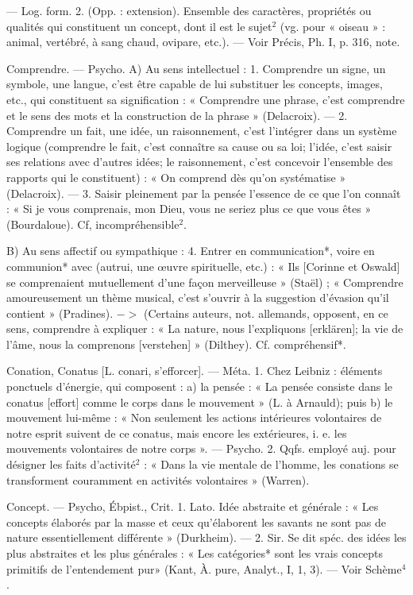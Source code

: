 — Log. form. 2. (Opp. : extension). Ensemble des caractères, propriétés ou qualités qui constituent
un concept, dont il est le sujet$^2$
(vg. pour « oiseau » : animal, vertébré, à sang chaud, ovipare, etc.).
— Voir Précis, Ph. I, p. 316, note.

Comprendre. — Psycho. A) Au sens
intellectuel : 1. Comprendre un
signe, un symbole, une langue, c'est
être capable de lui substituer les
concepts, images, etc., qui constituent sa signification : « Comprendre
une phrase, c’est comprendre et le
sens des mots et la construction de
la phrase » (Delacroix). — 2. Comprendre
un fait, une idée, un raisonnement, c’est l'intégrer dans un système logique (comprendre le fait,
c'est connaître sa cause ou sa loi;
l’idée, c’est saisir ses relations avec
d’autres idées; le raisonnement,
c'est concevoir l’ensemble des rapports qui le constituent) : « On comprend dès qu’on systématise » (Delacroix). — 3. Saisir pleinement par
la pensée l'essence de ce que l'on
connaît : « Si je vous comprenais,
mon Dieu, vous ne seriez plus ce que
vous êtes » (Bourdaloue). Cf, incompréhensible$^2$.

B) Au sens affectif ou sympathique : 4. Entrer en communication*, voire en communion* avec
(autrui, une œuvre spirituelle, etc.) :
« Ils [Corinne et Oswald] se comprenaient mutuellement d’une façon
merveilleuse » (Staël) ; « Comprendre
amoureusement un thème musical,
c'est s'ouvrir à la suggestion d'évasion qu'il contient » (Pradines).
$->$ (Certains auteurs, not. allemands, opposent, en ce sens, comprendre à expliquer : « La nature,
nous l'expliquons [erklären]; la vie
de l'âme, nous la comprenons [verstehen] » (Dilthey). Cf. compréhensif*.

Conation, Conatus [L. conari, s’efforcer]. — Méta. 1. Chez Leibniz : éléments ponctuels d'énergie, qui composent : a) la pensée : « La pensée
consiste dans le conatus [effort]
comme le corps dans le mouvement » (L. à Arnauld); puis b) le
mouvement lui-même : « Non seulement les actions intérieures volontaires de notre esprit suivent de ce
conatus, mais encore les extérieures,
i. e. les mouvements volontaires de
notre corps ». — Psycho. 2. Qqfs.
employé auj. pour désigner les faits
d'activité$^2$ : « Dans la vie mentale de
l'homme, les conations se transforment
couramment en activités volontaires » (Warren).

Concept. — Psycho, Ébpist., Crit. 1.
Lato. Idée abstraite et générale :
« Les concepts élaborés par la masse
et ceux qu’élaborent les savants ne
sont pas de nature essentiellement
différente » (Durkheim). — 2. Sir.
Se dit spéc. des idées les plus
abstraites et les plus générales :
« Les catégories* sont les vrais
concepts primitifs de l’entendement
pur» (Kant, À. pure, Analyt., I, 1, 3).
— Voir Schème$^4$.

